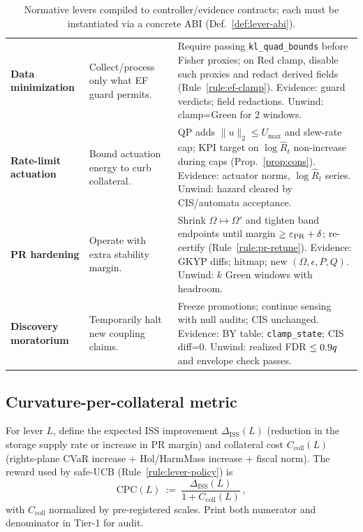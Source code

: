\begin{table}[t]
\begin{tabularx}{\textwidth}{@{}>{\raggedright\arraybackslash}p{2.8cm} >{\raggedright\arraybackslash}p{4.6cm} >{\raggedright\arraybackslash}X@{}}
\addlinespace
\textbf{Data minimization} &
Collect/process only what EF guard permits. &
Require passing \texttt{kl\_quad\_bounds} before Fisher proxies; on Red clamp, disable such proxies and redact derived fields (Rule~\ref{rule:ef-clamp}). Evidence: guard verdicts; field redactions. Unwind: clamp=Green for 2 windows. \\
\addlinespace
\textbf{Rate-limit actuation} &
Bound actuation energy to curb collateral. &
QP adds $\|u\|_2\!\le U_{\max}$ and slew-rate cap; KPI target on $\log\hat R_t$ non-increase during caps (Prop.~\ref{prop:cons}). Evidence: actuator norms, $\log\hat R_t$ series. Unwind: hazard cleared by CIS/automata acceptance. \\
\addlinespace
\textbf{PR hardening} &
Operate with extra stability margin. &
Shrink $\Omega\!\mapsto\!\Omega'$ and tighten band endpoints until margin $\ge\varepsilon_{\mathrm{PR}}+\delta$; re-certify (Rule~\ref{rule:pr-retune}). Evidence: GKYP diffs; hitmap; new $(\Omega,\epsilon,P,Q)$. Unwind: $k$ Green windows with headroom. \\
\addlinespace
\textbf{Discovery moratorium} &
Temporarily halt new coupling claims. &
Freeze promotions; continue sensing with null audits; CIS unchanged. Evidence: BY table; \texttt{clamp\_state}; CIS diff=0. Unwind: realized FDR $\le0.9q$ and envelope check passes. \\
\bottomrule
\end{tabularx}
\caption{Normative levers compiled to controller/evidence contracts; each must be instantiated via a concrete ABI (Def.~\ref{def:lever-abi}).}
\label{tab:normative-levers}
\end{table}

\subsection{Curvature-per-collateral metric}\label{subsec:cpc}
\emph{}

\begin{definition}\label{def:cpc}
For lever $L$, define the expected ISS improvement $\Delta_{\mathrm{ISS}}(L)$ (reduction in the storage supply rate or increase in PR margin) and collateral cost $C_{\mathrm{coll}}(L)$ (rights-plane CVaR increase $+$ Hol/HarmMass increase $+$ fiscal norm). The reward used by safe-UCB (Rule~\ref{rule:lever-policy}) is
\[
\mathrm{CPC}(L)\ :=\ \frac{\Delta_{\mathrm{ISS}}(L)}{1 + C_{\mathrm{coll}}(L)}\,,
\]
with $C_{\mathrm{coll}}$ normalized by pre-registered scales. Print both numerator and denominator in Tier-1 for audit.
\end{definition}

